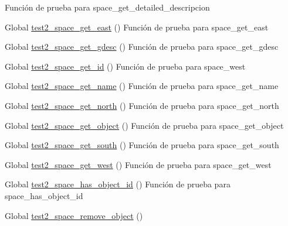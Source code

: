 \begin{DoxyRefList}
Función de prueba para space\+\_\+get\+\_\+detailed\+\_\+descripcion  
\item[Global \mbox{\hyperlink{space__test_8c_a249293510e61c6d5465f52c14343d02b}{test2\+\_\+space\+\_\+get\+\_\+east}} ()]\label{test__test000244}%
%
Función de prueba para space\+\_\+get\+\_\+east  
\item[Global \mbox{\hyperlink{space__test_8c_a3422f19fd8a821a06ccba2feb52034c2}{test2\+\_\+space\+\_\+get\+\_\+gdesc}} ()]\label{test__test000257}%
%
Función de prueba para space\+\_\+get\+\_\+gdesc  
\item[Global \mbox{\hyperlink{space__test_8c_af9087176b0d3c41d83a17a4918b13e31}{test2\+\_\+space\+\_\+get\+\_\+id}} ()]\label{test__test000234}%
%
Función de prueba para space\+\_\+west  
\item[Global \mbox{\hyperlink{space__test_8c_aee88ed31c63efc674051a4563aed86e2}{test2\+\_\+space\+\_\+get\+\_\+name}} ()]\label{test__test000238}%
%
Función de prueba para space\+\_\+get\+\_\+name  
\item[Global \mbox{\hyperlink{space__test_8c_a61891c9cebb9d26dc9f149ad8341517c}{test2\+\_\+space\+\_\+get\+\_\+north}} ()]\label{test__test000240}%
%
Función de prueba para space\+\_\+get\+\_\+north  
\item[Global \mbox{\hyperlink{space__test_8c_a0fe857c34f691aaba197d03315c3955f}{test2\+\_\+space\+\_\+get\+\_\+object}} ()]\label{test__test000248}%
%
Función de prueba para space\+\_\+get\+\_\+object  
\item[Global \mbox{\hyperlink{space__test_8c_a40fe07c07c1069023b362a9e506c4c59}{test2\+\_\+space\+\_\+get\+\_\+south}} ()]\label{test__test000242}%
%
Función de prueba para space\+\_\+get\+\_\+south  
\item[Global \mbox{\hyperlink{space__test_8c_af1cf02b01c007aec0684186b39666c32}{test2\+\_\+space\+\_\+get\+\_\+west}} ()]\label{test__test000246}%
%
Función de prueba para space\+\_\+get\+\_\+west  
\item[Global \mbox{\hyperlink{space__test_8c_adbd4d71faf31be7d4843821ad44ed099}{test2\+\_\+space\+\_\+has\+\_\+object\+\_\+id}} ()]\label{test__test000252}%
%
Función de prueba para space\+\_\+has\+\_\+object\+\_\+id  
\item[Global \mbox{\hyperlink{space__test_8c_a8f53f80be6eeff3b6e2fd0ce6b6ea310}{test2\+\_\+space\+\_\+remove\+\_\+object}} ()]\label{test__test000250}%

\end{DoxyRefList}
